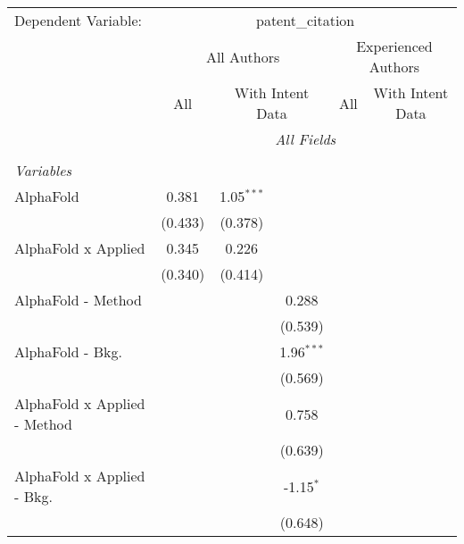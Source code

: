 \begingroup
\centering
\begin{tabular}{lcccccc}
   \tabularnewline \midrule \midrule
   Dependent Variable: & \multicolumn{6}{c}{patent\_citation}\\
 & \multicolumn{3}{c}{All Authors} & \multicolumn{3}{c}{Experienced Authors} \\
\cmidrule(lr){2-4} \cmidrule(lr){5-7}
 & \multicolumn{1}{c}{All} & \multicolumn{2}{c}{With Intent Data} & \multicolumn{1}{c}{All} & \multicolumn{2}{c}{With Intent Data} \\
\cmidrule(lr){2-2} \cmidrule(lr){3-4} \cmidrule(lr){5-5} \cmidrule(lr){6-7}
 & \multicolumn{6}{c}{\textit{All Fields}} \\ \\
   \emph{Variables}\\
   AlphaFold                      & 0.381        & 1.05$^{***}$ &              &         &         &   \\   
                                  & (0.433)      & (0.378)      &              &         &         &   \\   
   AlphaFold x Applied            & 0.345        & 0.226        &              &         &         &   \\   
                                  & (0.340)      & (0.414)      &              &         &         &   \\   
   AlphaFold - Method             &              &              & 0.288        &         &         &   \\   
                                  &              &              & (0.539)      &         &         &   \\   
   AlphaFold - Bkg.               &              &              & 1.96$^{***}$ &         &         &   \\   
                                  &              &              & (0.569)      &         &         &   \\   
   AlphaFold x Applied - Method   &              &              & 0.758        &         &         &   \\   
                                  &              &              & (0.639)      &         &         &   \\   
   AlphaFold x Applied - Bkg.     &              &              & -1.15$^{*}$  &         &         &   \\   
                                  &              &              & (0.648)      &         &         &   \\   

\end{tabular}
